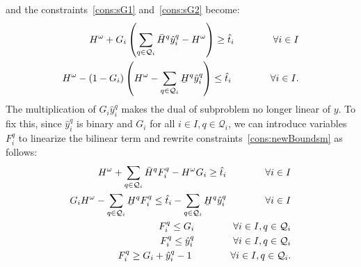 \documentclass[11pt]{article}
\renewcommand{\underbar}{\underaccent{\bar}}
\begin{document}
	and the constraints~\eqref{cons:sG1} and~\eqref{cons:sG2} become:
	\begin{subequations} \label{cons:newBoundsm}
		\begin{align}
			H^\omega + G_i \left(\sum_{q \in \mathcal{Q}_i} \bar{H}^q \hat{y}_i^q - H^\omega \right) \geq \hat{t}_i \qquad \qquad \forall i \in I\\
			H^\omega - (1 - G_i) \left(H^\omega - \sum_{q \in \mathcal{Q}_i} \underbar{H}^q \hat{y}_i^q \right) \leq \hat{t}_i \qquad \qquad \forall i \in I.
		\end{align}
	\end{subequations}
	The multiplication of \(G_i \hat{y}_i^q\) makes the dual of subproblem no longer linear of \(y\). To fix this, since \(\hat{y}_i^q\) is binary and \(G_i\) for all \(i \in I, q \in \mathcal{Q}_i\), we can introduce variables \(F_i^q\) to linearize the bilinear term and rewrite constraints~\eqref{cons:newBoundsm} as follows:
	\begin{subequations} \label{cons:newBoundsmlin}
		\begin{align}
			H^\omega + \sum_{q \in \mathcal{Q}_i} \bar{H}^q F_i^q - H^\omega G_i \geq \hat{t}_i \qquad \qquad \forall i \in I \label{cons:FG1}\\
			G_i H^\omega - \sum_{q \in \mathcal{Q}_i} \underbar{H}^q F_i^q \leq \hat{t}_i - \sum_{q \in \mathcal{Q}_i} \underbar{H}^q \hat{y}_i^q \qquad \qquad \forall i \in I \label{cons:FG2}\\
			F_i^q \leq G_i \qquad \qquad \forall i \in I, q \in \mathcal{Q}_i \label{cons:FGlin1}\\
			F_i^q \leq \hat{y}_i^q \qquad \qquad \forall i \in I, q \in \mathcal{Q}_i \label{cons:FGlin2}\\
			F_i^q \geq G_i + \hat{y}_i^q - 1 \qquad \qquad \forall i \in I, q \in \mathcal{Q}_i. \label{cons:FGlin3}
		\end{align}
	\end{subequations}
\end{document}
